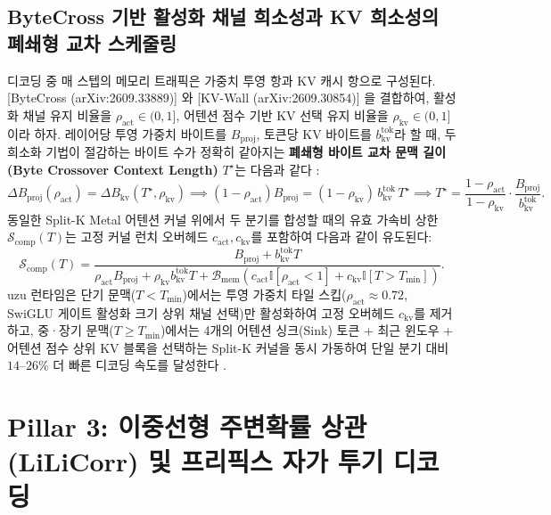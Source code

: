\documentclass[10pt,a4paper]{article}
\begin{document}
\subsection{\textsf{ByteCross} 기반 활성화 채널 희소성과 KV 희소성의 폐쇄형 교차 스케줄링}
디코딩 중 매 스텝의 메모리 트래픽은 가중치 투영 항과 KV 캐시 항으로 구성된다. [ByteCross (arXiv:2609.33889)] \cite{lee2026bytecross}와 [KV-Wall (arXiv:2609.30854)] \cite{singh2026kvwall}을 결합하여, 활성화 채널 유지 비율을 $\rho_{\text{act}} \in (0, 1]$, 어텐션 점수 기반 KV 선택 유지 비율을 $\rho_{\text{kv}} \in (0, 1]$이라 하자. 레이어당 투영 가중치 바이트를 $B_{\text{proj}}$, 토큰당 KV 바이트를 $b_{\text{kv}}^{\text{tok}}$라 할 때, 두 희소화 기법이 절감하는 바이트 수가 정확히 같아지는 \textbf{폐쇄형 바이트 교차 문맥 길이(Byte Crossover Context Length)} $T^\star$는 다음과 같다 \cite{lee2026bytecross}:
\begin{equation}
\Delta B_{\text{proj}}(\rho_{\text{act}}) = \Delta B_{\text{kv}}(T^\star, \rho_{\text{kv}}) \implies (1 - \rho_{\text{act}}) B_{\text{proj}} = (1 - \rho_{\text{kv}}) \, b_{\text{kv}}^{\text{tok}} \, T^\star \implies T^\star = \frac{1 - \rho_{\text{act}}}{1 - \rho_{\text{kv}}} \cdot \frac{B_{\text{proj}}}{b_{\text{kv}}^{\text{tok}}}.
\label{eq:bytecross}
\end{equation}
동일한 Split-K Metal 어텐션 커널 위에서 두 분기를 합성할 때의 유효 가속비 상한 $\mathcal{S}_{\text{comp}}(T)$는 고정 커널 런치 오버헤드 $c_{\text{act}}, c_{\text{kv}}$를 포함하여 다음과 같이 유도된다:
\begin{equation}
\mathcal{S}_{\text{comp}}(T) = \frac{B_{\text{proj}} + b_{\text{kv}}^{\text{tok}} T}{\rho_{\text{act}} B_{\text{proj}} + \rho_{\text{kv}} b_{\text{kv}}^{\text{tok}} T + \mathcal{B}_{\text{mem}} \left( c_{\text{act}} \mathbb{I}[\rho_{\text{act}} < 1] + c_{\text{kv}} \mathbb{I}[T > T_{\text{min}}] \right)}.
\label{eq:bytecross_speedup}
\end{equation}
\textsf{uzu} 런타임은 단기 문맥($T < T_{\text{min}}$)에서는 투영 가중치 타일 스킵($\rho_{\text{act}} \approx 0.72$, SwiGLU 게이트 활성화 크기 상위 채널 선택)만 활성화하여 고정 오버헤드 $c_{\text{kv}}$를 제거하고, 중·장기 문맥($T \ge T_{\text{min}}$)에서는 4개의 어텐션 싱크(Sink) 토큰 + 최근 윈도우 + 어텐션 점수 상위 KV 블록을 선택하는 Split-K 커널을 동시 가동하여 단일 분기 대비 $14\text{--}26\%$ 더 빠른 디코딩 속도를 달성한다 \cite{lee2026bytecross}.

\section{Pillar 3: 이중선형 주변확률 상관(\textsf{LiLiCorr}) 및 프리픽스 자가 투기 디코딩}
\end{document}
